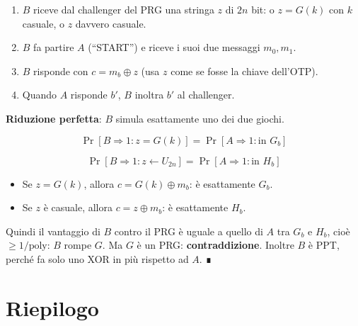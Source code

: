\begin{enumerate}
\def\labelenumi{\arabic{enumi}.}
\tightlist
\item
  \(B\) riceve dal challenger del PRG una stringa \(z\) di \(2n\) bit: o \(z = G(k)\) con \(k\) casuale, o \(z\) davvero casuale.
\item
  \(B\) fa partire \(A\) (``START'') e riceve i suoi due messaggi \(m_0, m_1\).
\item
  \(B\) risponde con \(c = m_b \oplus z\) (usa \(z\) come se fosse la chiave dell'OTP).
\item
  Quando \(A\) risponde \(b'\), \(B\) inoltra \(b'\) al challenger.
\end{enumerate}

\textbf{Riduzione perfetta}: \(B\) simula esattamente uno dei due giochi.

\[
\Pr[B \Rightarrow 1 : z = G(k)] = \Pr[A \Rightarrow 1 : \text{in } G_b]
\]

\[
\Pr[B \Rightarrow 1 : z \leftarrow U_{2n}] = \Pr[A \Rightarrow 1 : \text{in } H_b]
\]

\begin{itemize}
\tightlist
\item
  Se \(z = G(k)\), allora \(c = G(k) \oplus m_b\): è esattamente \(G_b\).
\item
  Se \(z\) è casuale, allora \(c = z \oplus m_b\): è esattamente \(H_b\).
\end{itemize}

Quindi il vantaggio di \(B\) contro il PRG è uguale a quello di \(A\) tra \(G_b\) e \(H_b\), cioè \(\ge 1/\text{poly}\): \(B\) rompe \(G\). Ma \(G\) è un PRG: \textbf{contraddizione}. Inoltre \(B\) è PPT, perché fa solo uno XOR in più rispetto ad \(A\). ∎

\section{Riepilogo}

